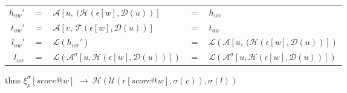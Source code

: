 \documentclass[10pt,a4paper,frenchb]{article}
\makeatletter
\newcommand{\applyop}	{\ensuremath{@}}
\newcommand{\noredex}	{\ensuremath{\applyop^o}}
\newcommand{\evalsym}			{\ensuremath{\epsilon}}
\newcommand{\boundevalsym}	{\ensuremath{\xi}}
\newcommand{\envsym}			{\ensuremath{\rho}}
\newcommand{\applysym}		{\ensuremath{\mathcal A}}
\newcommand{\boundapplysym}[1]	{\ensuremath{\applysym^{#1}}}
\newcommand{\eval}[1]					{\boundevalsym_\envsym^{#1}}
\newcommand{\evalexpr}[2][\bounds]	{\eval{#1}\left[#2\right]}
\newcommand{\evalsimpleshort}[1]		{\evalsym\left[#1\right]}
\newcommand{\apply}[3][\bounds]		{\boundapplysym{#1}\left[#2,#3\right]}
\newcommand{\applysimple}	[2]			{\applysym\left[#1,\ #2\right]}
\newcommand{\equivalence}[1]			{\head( \top (#1, \bounds(v)), \bounds(l))}
\newcommand{\ra}	{\ensuremath{\rightarrow}}
\newcommand{\mix}			{/}
\newcommand{\length}		{\ensuremath{\mathcal L}}
\newcommand{\dur}			{\ensuremath{\mathcal D}}
\newcommand{\head}			{\ensuremath{\mathcal H}}
\newcommand{\tail}			{\ensuremath{\mathcal T}}
\renewcommand{\top}		{\ensuremath{\mathcal U}}
\newcommand{\bounds}		{\ensuremath{\sigma}}
\newcommand{\nobounds}	{\ensuremath{\infty}}
\newcommand{\evaltable}[1][$\rightarrow$]	  {\begin{center} \begin{tabular*}{0.9\linewidth}{rc@{ #1 }l}}
\newcommand{\evaltitle}[1]						{\multicolumn{3}{l}{#1} \\ \hline}
\newcommand{\evaltablend}  		{\end{tabular*}\end{center}}
\newcommand{\evalspace}	  		{\vspace{2mm}\\}
\makeatother
\begin{document}
\begin{center} \begin{tabular*}{0.9\linewidth}{rclcl}
	$h_{uw}'$ 	& $=$ & $\applysimple{u}{(\head(\evalsimpleshort{w},\dur(u))}$ & $=$ & $h_{uw}$ \\
	$t_{uw}'$ 	& $=$ & $\applysimple{v}{\tail(\evalsimpleshort{w},\dur(u))}$ 	& $=$ & $t_{uw}$ 
\evalspace
	$l_{uw}'$ 	& $=$ & $\length(h_{uw}')$	& $=$ & $\length(\applysimple{u}{(\head(\evalsimpleshort{w},\dur(u))})$	\\
	$l_{uw}$ 	& $=$ & $\length(\apply{u}{\head(\evalsimpleshort{w},\dur(u))})$	& $=$ & $\length(\apply{u}{\head(\evalsimpleshort{w},\dur(u))})$	
\evaltablend


thus \hspace{1cm} $\evalexpr{score \applyop w}$ 	\ra $\: \equivalence{\evalsimpleshort{score \applyop w}}$


\end{document}

